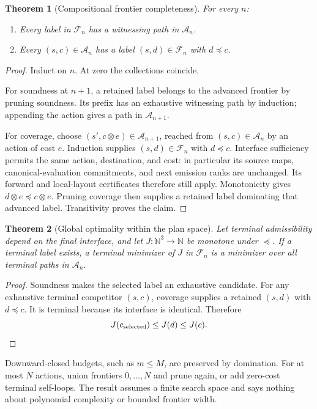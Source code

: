 \documentclass[11pt]{article}
\newtheorem{theorem}{Theorem}
\newcommand{\Front}{\mathcal F}
\newcommand{\All}{\mathcal A}
\newcommand{\Nat}{\mathbb N}
\begin{document}
\begin{theorem}[Compositional frontier completeness]
For every $n$:
\begin{enumerate}
\item Every label in $\Front_n$ has a witnessing path in $\All_n$.
\item Every $(s,c)\in\All_n$ has a label $(s,d)\in\Front_n$ with $d\preceq c$.
\end{enumerate}
\end{theorem}
\begin{proof}
Induct on $n$. At zero the collections coincide.

For soundness at $n+1$, a retained label belongs to the advanced frontier by pruning soundness. Its prefix has an exhaustive witnessing path by induction; appending the action gives a path in $\All_{n+1}$.

For coverage, choose $(s',c\otimes e)\in\All_{n+1}$, reached from $(s,c)\in\All_n$ by an action of cost $e$. Induction supplies $(s,d)\in\Front_n$ with $d\preceq c$. Interface sufficiency permits the same action, destination, and cost: in particular its source maps, canonical-evaluation commitments, and next emission ranks are unchanged. Its forward and local-layout certificates therefore still apply. Monotonicity gives $d\otimes e\preceq c\otimes e$. Pruning coverage then supplies a retained label dominating that advanced label. Transitivity proves the claim.
\end{proof}

\begin{theorem}[Global optimality within the plan space]
Let terminal admissibility depend on the final interface, and let $J:\Nat^3\to\Nat$ be monotone under $\preceq$. If a terminal label exists, a terminal minimizer of $J$ in $\Front_n$ is a minimizer over all terminal paths in $\All_n$.
\end{theorem}
\begin{proof}
Soundness makes the selected label an exhaustive candidate. For any exhaustive terminal competitor $(s,c)$, coverage supplies a retained $(s,d)$ with $d\preceq c$. It is terminal because its interface is identical. Therefore
\[
 J(c_{\rm selected})\le J(d)\le J(c).
\]
\end{proof}
Downward-closed budgets, such as $m\le M$, are preserved by domination. For at most $N$ actions, union frontiers $0,\ldots,N$ and prune again, or add zero-cost terminal self-loops. The result assumes a finite search space and says nothing about polynomial complexity or bounded frontier width.
\end{document}
